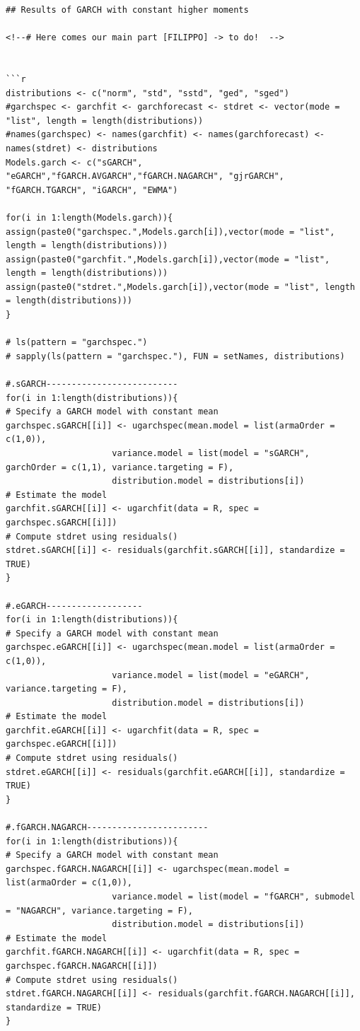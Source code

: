 \documentclass[a4paper,nobind]{templates/ociamthesis}
\begin{document}
\begin{verbatim}
## Results of GARCH with constant higher moments

<!--# Here comes our main part [FILIPPO] -> to do!  -->


```r
distributions <- c("norm", "std", "sstd", "ged", "sged")
#garchspec <- garchfit <- garchforecast <- stdret <- vector(mode = "list", length = length(distributions))
#names(garchspec) <- names(garchfit) <- names(garchforecast) <- names(stdret) <- distributions
Models.garch <- c("sGARCH", "eGARCH","fGARCH.AVGARCH","fGARCH.NAGARCH", "gjrGARCH", "fGARCH.TGARCH", "iGARCH", "EWMA")

for(i in 1:length(Models.garch)){
assign(paste0("garchspec.",Models.garch[i]),vector(mode = "list", length = length(distributions)))
assign(paste0("garchfit.",Models.garch[i]),vector(mode = "list", length = length(distributions)))
assign(paste0("stdret.",Models.garch[i]),vector(mode = "list", length = length(distributions)))
} 

# ls(pattern = "garchspec.")
# sapply(ls(pattern = "garchspec."), FUN = setNames, distributions)

#.sGARCH--------------------------
for(i in 1:length(distributions)){
# Specify a GARCH model with constant mean
garchspec.sGARCH[[i]] <- ugarchspec(mean.model = list(armaOrder = c(1,0)),
                     variance.model = list(model = "sGARCH", garchOrder = c(1,1), variance.targeting = F), 
                     distribution.model = distributions[i])
# Estimate the model
garchfit.sGARCH[[i]] <- ugarchfit(data = R, spec = garchspec.sGARCH[[i]])
# Compute stdret using residuals()
stdret.sGARCH[[i]] <- residuals(garchfit.sGARCH[[i]], standardize = TRUE)
}

#.eGARCH-------------------
for(i in 1:length(distributions)){
# Specify a GARCH model with constant mean
garchspec.eGARCH[[i]] <- ugarchspec(mean.model = list(armaOrder = c(1,0)),
                     variance.model = list(model = "eGARCH", variance.targeting = F), 
                     distribution.model = distributions[i])
# Estimate the model
garchfit.eGARCH[[i]] <- ugarchfit(data = R, spec = garchspec.eGARCH[[i]])
# Compute stdret using residuals()
stdret.eGARCH[[i]] <- residuals(garchfit.eGARCH[[i]], standardize = TRUE)
}

#.fGARCH.NAGARCH------------------------
for(i in 1:length(distributions)){
# Specify a GARCH model with constant mean
garchspec.fGARCH.NAGARCH[[i]] <- ugarchspec(mean.model = list(armaOrder = c(1,0)),
                     variance.model = list(model = "fGARCH", submodel = "NAGARCH", variance.targeting = F),
                     distribution.model = distributions[i])
# Estimate the model
garchfit.fGARCH.NAGARCH[[i]] <- ugarchfit(data = R, spec = garchspec.fGARCH.NAGARCH[[i]])
# Compute stdret using residuals()
stdret.fGARCH.NAGARCH[[i]] <- residuals(garchfit.fGARCH.NAGARCH[[i]], standardize = TRUE)
}


\end{verbatim}
\end{document}
